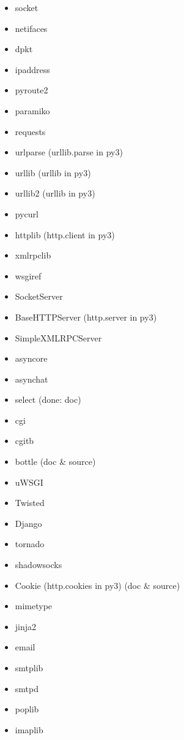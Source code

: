 \documentclass{article}
\begin{document}
\begin{enumerate}
\begin{itemize}
            \item socket
            \item netifaces
            \item dpkt
            \item ipaddress
            \item pyroute2
            \item paramiko
            \item requests
            \item urlparse (urllib.parse in py3)
            \item urllib (urllib in py3)
            \item urllib2 (urllib in py3)
            \item pycurl
            \item httplib (http.client in py3)
            \item xmlrpclib
            \item wsgiref
            \item SocketServer
            \item BaseHTTPServer (http.server in py3)
            \item SimpleXMLRPCServer
            \item asyncore
            \item asynchat
            \item select (done: doc)
            \item cgi
            \item cgitb
            \item bottle (doc & source)
            \item uWSGI
            \item Twisted
            \item Django
            \item tornado
            \item shadowsocks
            \item Cookie (http.cookies in py3) (doc & source)

            \item mimetype

            \item jinja2

            \item email
            \item smtplib
            \item smtpd
            \item poplib
            \item imaplib


\end{itemize}
\end{enumerate}
\end{document}
